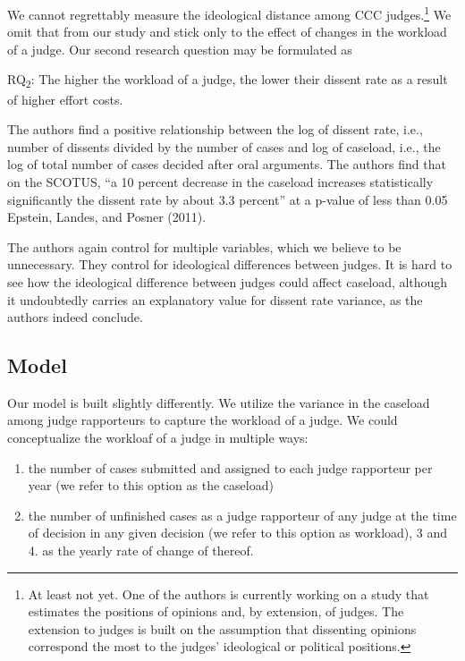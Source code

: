 \documentclass[
  11pt,
]{article}
\providecommand{\tightlist}{%
  \setlength{\itemsep}{0pt}\setlength{\parskip}{0pt}}
\begin{document}
We cannot regrettably measure the ideological distance among CCC
judges.\footnote{At least not yet. One of the authors is currently
  working on a study that estimates the positions of opinions and, by
  extension, of judges. The extension to judges is built on the
  assumption that dissenting opinions correspond the most to the judges'
  ideological or political positions.} We omit that from our study and
stick only to the effect of changes in the workload of a judge. Our
second research question may be formulated as

RQ\textsubscript{2}: The higher the workload of a judge, the lower their
dissent rate as a result of higher effort costs.

The authors find a positive relationship between the log of dissent
rate, i.e., number of dissents divided by the number of cases and log of
caseload, i.e., the log of total number of cases decided after oral
arguments. The authors find that on the SCOTUS, ``a 10 percent decrease
in the caseload increases statistically significantly the dissent rate
by about 3.3 percent'' at a p-value of less than 0.05 Epstein, Landes,
and Posner (2011).

The authors again control for multiple variables, which we believe to be
unnecessary. They control for ideological differences between judges. It
is hard to see how the ideological difference between judges could
affect caseload, although it undoubtedly carries an explanatory value
for dissent rate variance, as the authors indeed conclude.

\hypertarget{model}{%
\subsection{Model}\label{model}}

Our model is built slightly differently. We utilize the variance in the
caseload among judge rapporteurs to capture the workload of a judge. We
could conceptualize the workloaf of a judge in multiple ways:

\begin{enumerate}
\def\labelenumi{\arabic{enumi}.}
\tightlist
\item
  the number of cases submitted and assigned to each judge rapporteur
  per year (we refer to this option as the caseload)
\item
  the number of unfinished cases as a judge rapporteur of any judge at
  the time of decision in any given decision (we refer to this option as
  workload), 3 and 4. as the yearly rate of change of thereof.
\end{enumerate}
\end{document}
